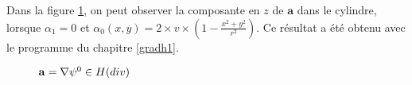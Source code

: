 Dans la figure \ref{az}, on peut observer la composante en $z$ de $\mathbf{a}$ dans le cylindre, lorsque $\alpha_1=0$ et $\alpha_0(x,y)=2\times v\times\left(1-\frac{x^2+y^2}{r^2}\right)$. Ce résultat a été obtenu avec le programme du chapitre \ref{gradh1}. 

\begin{figure}[H]
\makebox[\textwidth][c]{
  \subfloat{\texttt{[image: az]}}\ 
  \subfloat{\texttt{[image: az1]}}
}
\caption{$\mathbf{a}={\nabla}\psi^0\in H(div)$}
\label{az}
\end{figure}

